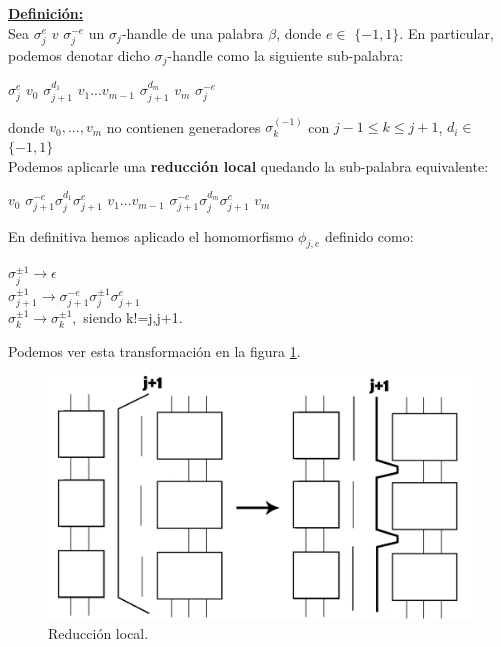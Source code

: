 \underline{\textbf{ Definición:}}\\
Sea $\sigma_{j}^{e}$ $v$ $\sigma_{j}^{-e} $ un $\sigma_{j}$-handle de una palabra $\beta$, donde $e \in$ $ \{-1,1\} $. En particular, podemos denotar dicho $\sigma_{j}$-handle como la siguiente sub-palabra:
\begin{center}
	$ \sigma_{j}^{e} $ $ v_{0} $ $\sigma_{j+1}^{d_{1}} $ $ v_{1}...v_{m-1} $ $\sigma_{j+1}^{d_{m}} $ $ v_{m} $ $ \sigma_{j}^{-e} $
\end{center} donde $v_{0},...,v_{m}$ no contienen generadores $\sigma_{k}^{(-1)}$ con $ j-1 \le k \le j+1 $, $d_{i} \in$ $ \{-1,1\} $\\
Podemos aplicarle una \textbf{reducción local} quedando la sub-palabra equivalente:
\begin{center}
 $ v_{0} $ $\sigma_{j+1}^{-e} \sigma_{j}^{d_{1}} \sigma_{j+1}^{e}$ $ v_{1}...v_{m-1} $ $\sigma_{j+1}^{-e} \sigma_{j}^{d_{m}} \sigma_{j+1}^{e}$ $ v_{m} $
\end{center}
En definitiva hemos aplicado el homomorfismo $\phi_{j,e}$ definido como:
\begin{center}
	$\sigma_{j}^{\pm 1} \rightarrow \epsilon$\\
	$\sigma_{j+1}^{\pm 1} \rightarrow \sigma_{j+1}^{-e} \sigma_{j}^{\pm 1} \sigma_{j+1}^{e}$\\
	$\sigma_{k}^{\pm 1} \rightarrow \sigma_{k}^{\pm 1},$ siendo k!=j,j+1.\\
\end{center}

Podemos ver esta transformación en la figura \ref{h3}.\\
\begin{figure}[h!]
	\centering
	\includegraphics[width=14cm]{itrenzas/h14.png}
	\caption{Reducción local.}
	\label{h3} 
\end{figure}

